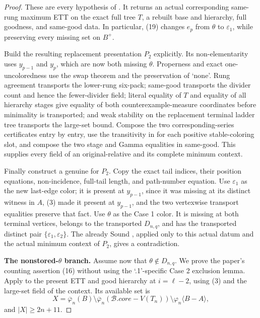 \begin{proof}
These are every hypothesis of
.  It returns an actual
corresponding same-rung maximum ETT on the exact full tree \(T\), a
rebuilt base and hierarchy, full goodness, and same-good data.  In
particular, (19) changes \(e_p\) from \(\theta\) to
\(\varepsilon_1\), while preserving every missing set on \(B^+\).

Build the resulting replacement presentation \(P_2\) explicitly.  Its
non-elementarity uses \(y_{p-1}\) and \(y_p\), which are now both
missing \(\theta\).  Properness and exact one-uncoloredness use the swap
theorem and the preservation of `none'.  Rung agreement transports the
lower-rung six-pack; same-good transports the divider count and hence
the fewer-divider field; literal equality of \(T\) and equality of all
hierarchy stages give equality of both counterexample-measure coordinates
before minimality is transported; and weak stability on the replacement
terminal ladder tree transports the large-set bound.  Compose the two
corresponding-series certificates entry by entry, use the transitivity
in  for each positive stable-coloring slot, and compose the
two stage and Gamma equalities in same-good.  This supplies every field
of an original-relative  and
its complete minimum context.

Finally construct a genuine
 for \(P_2\).  Copy the exact
tail indices, their position equations, non-incidence, full-tail length,
and path-number equation.  Use \(\varepsilon_1\) as the new last-edge
color; it is present at \(y_{p-1}\), since it was missing at its distinct
witness in \(A\), (3) made it present at \(y_{p-1}\), and the two
vertexwise transport equalities preserve that fact.  Use \(\theta\) as
the Case 1 color.  It is missing at both terminal vertices, belongs to
the transported \(D_{n,q}\), and has the transported distinct pair
\(\{\varepsilon_1,\varepsilon_2\}\).  The already Sound
, applied only to this actual
datum and the actual minimum context of \(P_2\), gives a contradiction.

\textbf{The nonstored-\(\theta\) branch.}
Assume now that \(\theta\notin D_{n,q}\).  We prove the paper's counting
assertion (16) without using the `.1'-specific Case 2 exclusion lemma.
Apply  to the present ETT and good hierarchy at
\(i=\ell-2\), using (3) and the large-set field of the context.  Its
available set is
\[
 X=\overline\varphi_n(B)
   \setminus\overline\varphi_n(\mathcal B.\mathit{core}-V(T_n))
   \setminus\varphi_n\langle B-A\rangle,
\]
and \(|X|\geq2n+11\).


\end{proof}
